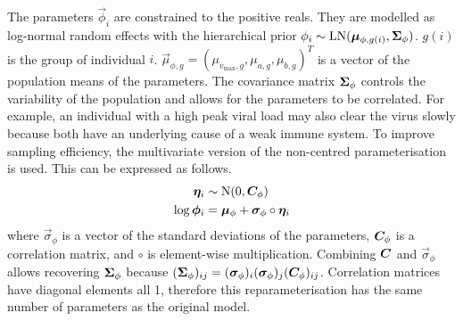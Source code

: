 \documentclass[thesis.tex]{subfiles}
\begin{document}
The parameters $\vec{\phi}_i$ are constrained to the positive reals.
They are modelled as log-normal random effects with the hierarchical prior $\phi_i \sim \operatorname{LN}(\bm{\mu}_{\phi,g(i)}, \bm{\Sigma}_\phi)$.
$g(i)$ is the group of individual $i$.
$\vec{\mu}_{\phi,g} = (\mu_{v_{\max},g}, \mu_{a,g}, \mu_{b,g})^T$ is a vector of the population means of the parameters.
The covariance matrix $\bm{\Sigma}_\phi$ controls the variability of the population and allows for the parameters to be correlated.
For example, an individual with a high peak viral load may also clear the virus slowly because both have an underlying cause of a weak immune system.
To improve sampling efficiency, the multivariate version of the non-centred parameterisation is used.
This can be expressed as follows.
\begin{align}
  \bm{\eta}_i &\sim \operatorname{N}(0, \bm{C}_\phi) \\
  \log \bm{\phi}_i &= \bm{\mu}_\phi + \bm{\sigma}_\phi \circ \bm{\eta}_i
\end{align}
where $\vec{\sigma}_\phi$ is a vector of the standard deviations of the parameters, $\bm{C}_\phi$ is a correlation matrix, and $\circ$ is element-wise multiplication.
Combining $\bm{C}$ and $\vec{\sigma}_\phi$ allows recovering $\bm\Sigma_\phi$ because $(\bm{\Sigma}_\phi)_{ij} = (\bm{\sigma}_\phi)_i (\bm{\sigma}_\phi)_j (\bm{C}_\phi)_{ij}$.
Correlation matrices have diagonal elements all 1, therefore this reparameterisation has the same number of parameters as the original model.
\end{document}
